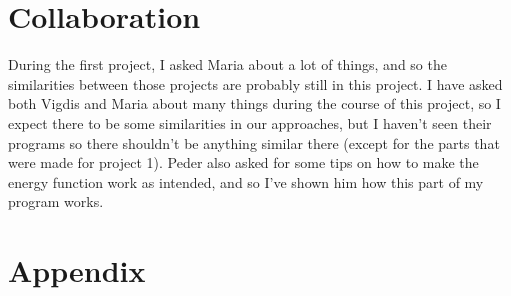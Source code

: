 \documentclass[a4paper,12pt]{article}
\begin{document}
\section{Collaboration}
During the first project, I asked Maria about a lot of things, and so the similarities between those projects are probably still in this project.
I have asked both Vigdis and Maria about many things during the course of this project, so I expect there to be some similarities in our approaches, but I haven't seen their programs so there shouldn't be anything similar there (except for the parts that were made for project 1). Peder also asked for some tips on how to make the energy function work as intended, and so I've shown him how this part of my program works. 

\section{Appendix}
\end{document}
